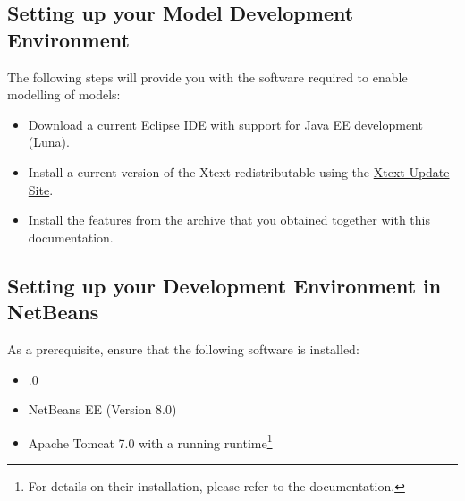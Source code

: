 
\subsection{Setting up your \MD Model Development Environment}

The following steps will provide you with the software required to enable modelling of \MD models:

\begin{itemize}
\item Download a current Eclipse IDE with support for Java EE development (\eg Luna).
\item Install a current version of the Xtext redistributable using the \href{https://eclipse.org/Xtext/download.html}{Xtext Update Site}.
\item Install the \MD features from the archive that you obtained together with this documentation.
\end{itemize}


\subsection{Setting up your \mapapps Development Environment in NetBeans}
\label{subsec:basic-setup}

As a prerequisite, ensure that the following software is installed:

\begin{itemize}
\item {}.0
\item NetBeans EE (\eg Version 8.0)
\item Apache Tomcat 7.0 with a running \mapapps runtime\footnote{For details on their installation, please refer to the \mapapps documentation.}
\end{itemize}

